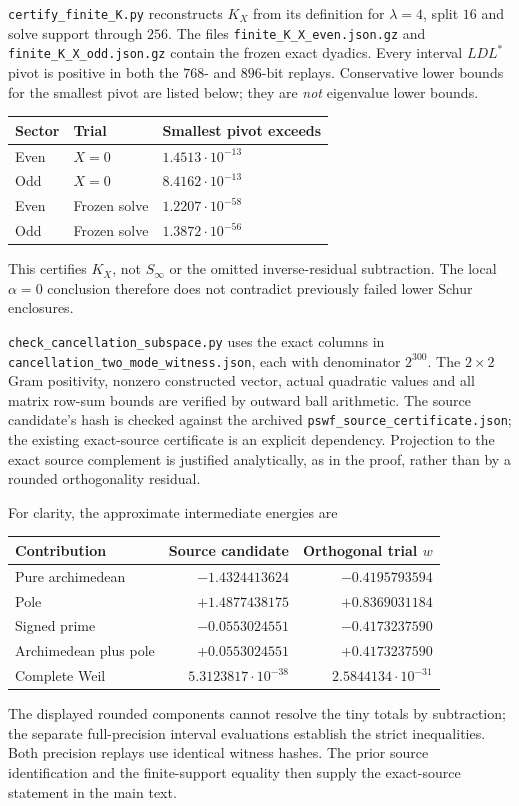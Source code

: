 \documentclass[11pt]{article}
\theoremstyle{remark}
\begin{document}
\texttt{certify\_finite\_K.py} reconstructs $K_X$ from its definition
for $\lambda=4$, split $16$ and solve support through $256$.
The files \texttt{finite\_K\_X\_even.json.gz} and
\texttt{finite\_K\_X\_odd.json.gz} contain the frozen exact dyadics.
Every interval $LDL^*$ pivot is positive in both the $768$- and
$896$-bit replays. Conservative lower bounds for the smallest pivot
are listed below; they are \emph{not} eigenvalue lower bounds.
\begin{center}
\begin{tabular}{@{}lll@{}}
\toprule Sector & Trial & Smallest pivot exceeds\\\midrule
Even & $X=0$ & $1.4513\cdot10^{-13}$\\
Odd & $X=0$ & $8.4162\cdot10^{-13}$\\
Even & Frozen solve & $1.2207\cdot10^{-58}$\\
Odd & Frozen solve & $1.3872\cdot10^{-56}$\\\bottomrule
\end{tabular}
\end{center}
This certifies $K_X$, not $S_\infty$ or the omitted inverse-residual
subtraction. The local $\alpha=0$ conclusion therefore does not
contradict previously failed lower Schur enclosures.

\nolinkurl{check_cancellation_subspace.py} uses the exact columns in
\nolinkurl{cancellation_two_mode_witness.json}, each with denominator
$2^{300}$. The $2\times2$ Gram positivity, nonzero constructed vector,
actual quadratic values and all matrix row-sum bounds are verified by
outward ball arithmetic. The source candidate's hash is checked
against the archived \texttt{pswf\_source\_certificate.json}; the
existing exact-source certificate is an explicit dependency.
Projection to the exact source complement is justified analytically,
as in the proof, rather than by a rounded orthogonality residual.

For clarity, the approximate intermediate energies are
\begin{center}
\begin{tabular}{@{}lrr@{}}
\toprule Contribution & Source candidate & Orthogonal trial $w$\\\midrule
Pure archimedean & $-1.4324413624$ & $-0.4195793594$\\
Pole & $+1.4877438175$ & $+0.8369031184$\\
Signed prime & $-0.0553024551$ & $-0.4173237590$\\
Archimedean plus pole & $+0.0553024551$ & $+0.4173237590$\\
Complete Weil & $5.3123817\cdot10^{-38}$ & $2.5844134\cdot10^{-31}$\\
\bottomrule
\end{tabular}
\end{center}
The displayed rounded components cannot resolve the tiny totals by
subtraction; the separate full-precision interval evaluations establish
the strict inequalities. Both precision replays use identical witness
hashes. The prior source identification and the finite-support equality
then supply the exact-source statement in the main text.
\end{document}
